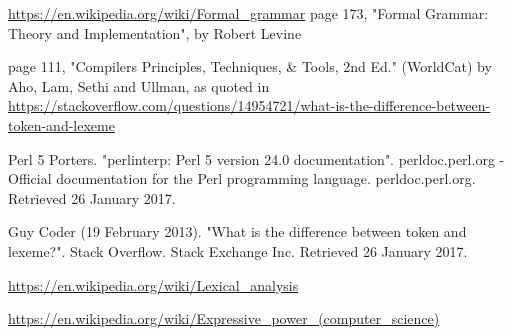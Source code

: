 \documentclass[twocolumn,10ptr]{article}
\begin{document}
	
	
	
	
	
	
	
	\onecolumn
	\begin{thebibliography}{9}
		\url{https://en.wikipedia.org/wiki/Formal_grammar}
		page 173, "Formal Grammar: Theory and Implementation", by Robert Levine
		
		page 111, "Compilers Principles, Techniques, \& Tools, 2nd Ed." (WorldCat) by Aho, Lam, Sethi and Ullman, as quoted in \url{https://stackoverflow.com/questions/14954721/what-is-the-difference-between-token-and-lexeme}  
		
		Perl 5 Porters. "perlinterp: Perl 5 version 24.0 documentation". perldoc.perl.org - Official documentation for the Perl programming language. perldoc.perl.org. Retrieved 26 January 2017.
		
		Guy Coder (19 February 2013). "What is the difference between token and lexeme?". Stack Overflow. Stack Exchange Inc. Retrieved 26 January 2017.
		
		\url{https://en.wikipedia.org/wiki/Lexical_analysis}
		
		\url{https://en.wikipedia.org/wiki/Expressive_power_(computer_science)}
		
		
	\end{thebibliography}
	
	
	
	
	
\end{document}
